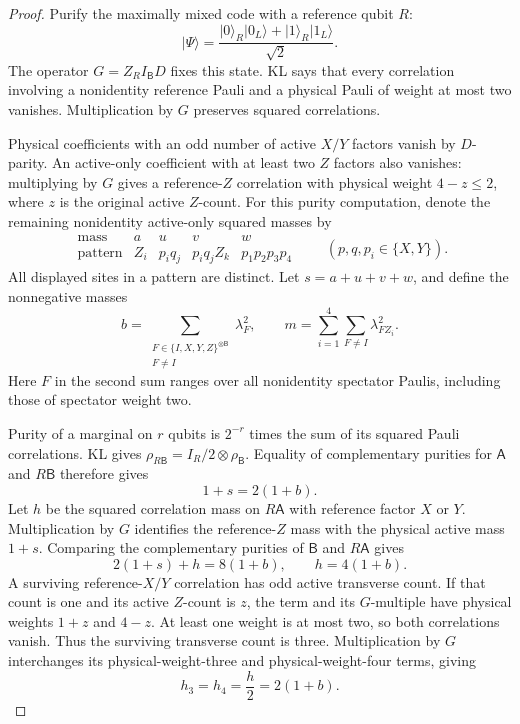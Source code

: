 \documentclass[11pt]{article}
\newcommand{\F}{\mathbb F}
\newcommand{\ket}[1]{\lvert #1\rangle}
\theoremstyle{definition}
\begin{document}
\begin{proof}
Purify the maximally mixed code with a reference qubit \(R\):
\[
 \ket{\Psi}=
 \frac{\ket0_R\ket{0_L}+\ket1_R\ket{1_L}}{\sqrt2}.
\]
The operator \(G=Z_RI_{\mathsf B}D\) fixes this state. KL says that every
correlation involving a nonidentity reference Pauli and a physical
Pauli of weight at most two vanishes. Multiplication by \(G\) preserves
squared correlations.

Physical coefficients with an odd number of active \(X/Y\) factors
vanish by \(D\)-parity. An active-only coefficient with at least two
\(Z\) factors also vanishes: multiplying by \(G\) gives a
reference-\(Z\) correlation with physical weight \(4-z\le2\), where
\(z\) is the original active \(Z\)-count.
For this purity computation, denote the remaining nonidentity
active-only squared masses by
\[
 \begin{array}{c|cccc}
 \text{mass}&a&u&v&w\\ \hline
 \text{pattern}&Z_i&p_iq_j&p_iq_jZ_k&p_1p_2p_3p_4
 \end{array}
 \qquad(p,q,p_i\in\{X,Y\}).
\]
All displayed sites in a pattern are distinct. Let \(s=a+u+v+w\), and
define the nonnegative masses
\[
 b=\sum_{\substack{F\in\{I,X,Y,Z\}^{\otimes\mathsf B}\\F\ne I}}
       \lambda_F^2,\qquad
 m=\sum_{i=1}^4\sum_{F\ne I}\lambda_{FZ_i}^2.
\]
Here \(F\) in the second sum ranges over all nonidentity spectator
Paulis, including those of spectator weight two.

Purity of a marginal on \(r\) qubits is \(2^{-r}\) times the sum of its
squared Pauli correlations. KL gives
\(\rho_{R\mathsf B}=I_R/2\otimes\rho_{\mathsf B}\).
Equality of complementary purities for \(\mathsf A\) and \(R\mathsf B\)
therefore gives
\begin{equation}
 1+s=2(1+b).
 \label{o2gc:purity-1}
\end{equation}
Let \(h\) be the squared correlation mass on \(R\mathsf A\) with
reference factor \(X\) or \(Y\). Multiplication by \(G\) identifies the
reference-\(Z\) mass with the physical active mass \(1+s\). Comparing
the complementary purities of \(\mathsf B\) and \(R\mathsf A\) gives
\[
 2(1+s)+h=8(1+b),\qquad h=4(1+b).
\]
A surviving reference-\(X/Y\) correlation has odd active transverse
count. If that count is one and its active \(Z\)-count is \(z\), the
term and its \(G\)-multiple have physical weights \(1+z\) and \(4-z\).
At least one weight is at most two, so both correlations vanish.
Thus the surviving transverse count is three. Multiplication by \(G\)
interchanges its physical-weight-three and physical-weight-four
terms, giving
\begin{equation}
 h_3=h_4=\frac h2=2(1+b).
 \label{o2gc:purity-h}
\end{equation}


\end{proof}
\end{document}
